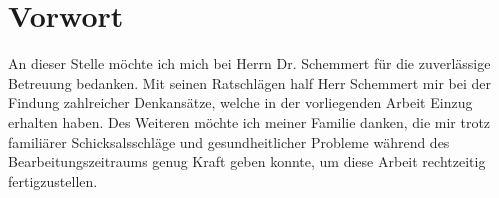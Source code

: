 \chapter{Vorwort}
An dieser Stelle möchte ich mich bei Herrn Dr. Schemmert für die zuverlässige Betreuung bedanken. Mit seinen Ratschlägen half  Herr Schemmert mir bei der Findung zahlreicher Denkansätze, welche in der vorliegenden Arbeit Einzug erhalten haben. Des Weiteren möchte ich meiner Familie danken, die mir trotz familiärer Schicksalsschläge und gesundheitlicher Probleme während des Bearbeitungszeitraums genug Kraft geben konnte, um diese Arbeit rechtzeitig fertigzustellen.